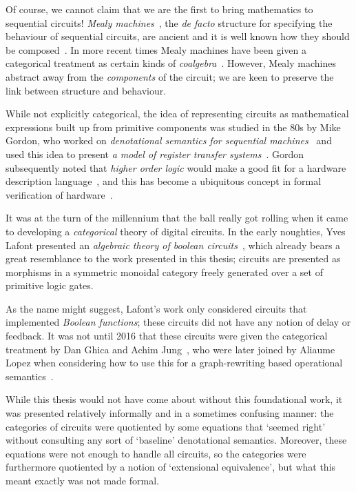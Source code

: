 Of course, we cannot claim that we are the first to bring mathematics to
sequential circuits!
\emph{Mealy machines}~\cite{mealy1955method}, the \emph{de facto} structure for
specifying the behaviour of sequential circuits, are ancient and it is well
known how they should be composed~\cite{ginzburg2014algebraic}.
In more recent times Mealy machines have been given a categorical treatment as
certain kinds of \emph{coalgebra}~\cite{rutten2006algebraic,bonsangue2008coalgebraic}.
However, Mealy machines abstract away from the \emph{components} of the circuit;
we are keen to preserve the link between structure and behaviour.

While not explicitly categorical, the idea of representing circuits as
mathematical expressions built up from primitive components was studied in the
80s by Mike Gordon, who worked on
\emph{denotational semantics for sequential machines}~\cite{gordon1980denotational}
and used this idea to present
\emph{a model of register transfer systems}~\cite{gordon1982model}.
Gordon subsequently noted that \emph{higher order logic} would make a good fit
for a hardware description language~\cite{gordon1985why}, and this has become
a ubiquitous concept in formal verification of hardware~\cite{gupta1992formal}.

It was at the turn of the millennium that the ball really got rolling when it
came to developing a \emph{categorical} theory of digital circuits.
In the early noughties, Yves Lafont presented an
\emph{algebraic theory of boolean circuits}~\cite{lafont2003algebraic}, which
already bears a great resemblance to the work presented in this thesis; circuits
are presented as morphisms in a symmetric monoidal category freely generated
over a set of primitive logic gates.

As the name might suggest, Lafont's work only considered circuits that
implemented \emph{Boolean functions}; these circuits did not have any notion of
delay or feedback.
It was not until 2016 that these circuits were given the categorical treatment
by Dan Ghica and Achim Jung~\cite{ghica2016categorical}, who were later joined
by Aliaume Lopez when considering how to use this for a graph-rewriting based
operational semantics~\cite{ghica2017diagrammatic}.

While this thesis would not have come about without this foundational work, it
was presented relatively informally and in a sometimes confusing manner:
the categories of circuits were quotiented by some equations that `seemed right'
without consulting any sort of `baseline' denotational semantics.
Moreover, these equations were not enough to handle all circuits, so the
categories were furthermore quotiented by a notion of `extensional equivalence',
but what this meant exactly was not made formal.

